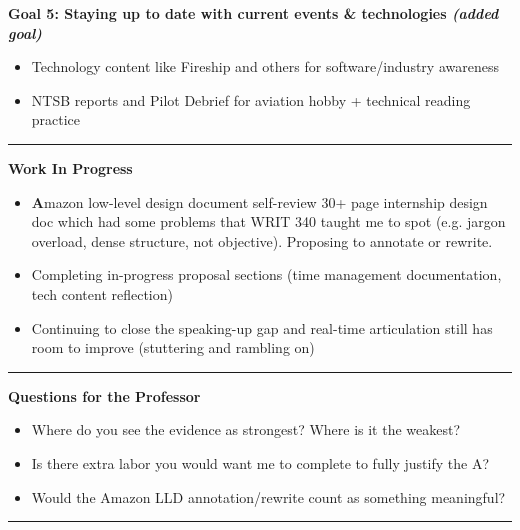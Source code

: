 \documentclass[10pt]{article}
\begin{document}
\begin{small}
\vspace{2pt}
\textbf{Goal 5: Staying up to date with current events \& technologies \textit{(added goal)}}
\begin{itemize}
  \item Technology content like Fireship and others for software/industry awareness
  \item NTSB reports and Pilot Debrief for aviation hobby + technical reading practice
\end{itemize}

\end{small}

\vspace{5pt}\hrule\vspace{5pt}

\textbf{Work In Progress}

\begin{small}
\begin{itemize}
  \item \textbf Amazon low-level design document self-review 30+ page internship design doc which had some problems that WRIT 340 taught me to spot (e.g. jargon overload, dense structure, not objective). Proposing to annotate or rewrite.
  \item Completing in-progress proposal sections (time management documentation, tech content reflection)
  \item Continuing to close the speaking-up gap and real-time articulation still has room to improve (stuttering and rambling on)
\end{itemize}
\end{small}

\vspace{5pt}\hrule\vspace{5pt}

\textbf{Questions for the Professor}

\begin{small}
\begin{itemize}
  \item Where do you see the evidence as strongest? Where is it the weakest?
  \item Is there extra labor you would want me to complete to fully justify the A?
  \item Would the Amazon LLD annotation/rewrite count as something meaningful?
\end{itemize}
\end{small}

\vspace{5pt}\hrule\vspace{3pt}
\end{document}
